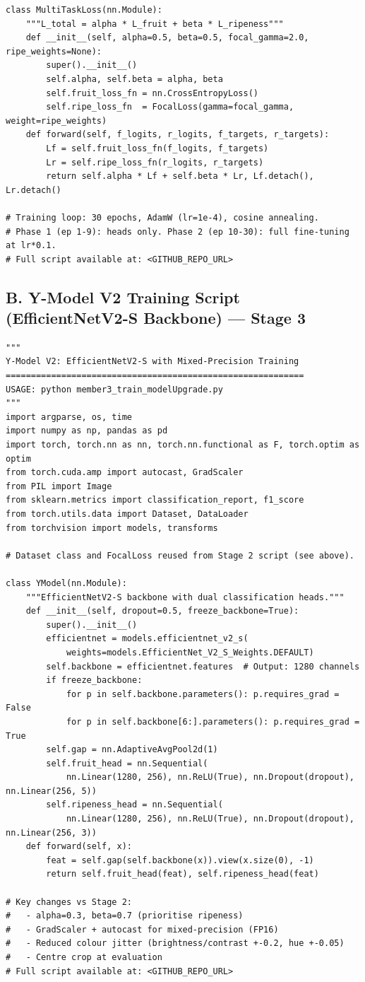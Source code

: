 \documentclass[10pt,twocolumn,letterpaper]{article}
\begin{document}
{\begin{verbatim}
class MultiTaskLoss(nn.Module):
    """L_total = alpha * L_fruit + beta * L_ripeness"""
    def __init__(self, alpha=0.5, beta=0.5, focal_gamma=2.0, ripe_weights=None):
        super().__init__()
        self.alpha, self.beta = alpha, beta
        self.fruit_loss_fn = nn.CrossEntropyLoss()
        self.ripe_loss_fn  = FocalLoss(gamma=focal_gamma, weight=ripe_weights)
    def forward(self, f_logits, r_logits, f_targets, r_targets):
        Lf = self.fruit_loss_fn(f_logits, f_targets)
        Lr = self.ripe_loss_fn(r_logits, r_targets)
        return self.alpha * Lf + self.beta * Lr, Lf.detach(), Lr.detach()

# Training loop: 30 epochs, AdamW (lr=1e-4), cosine annealing.
# Phase 1 (ep 1-9): heads only. Phase 2 (ep 10-30): full fine-tuning at lr*0.1.
# Full script available at: <GITHUB_REPO_URL>
\end{verbatim}
}

\subsection*{B. Y-Model V2 Training Script (EfficientNetV2-S Backbone) — Stage 3}

{\small
\begin{verbatim}
"""
Y-Model V2: EfficientNetV2-S with Mixed-Precision Training
===========================================================
USAGE: python member3_train_modelUpgrade.py
"""
import argparse, os, time
import numpy as np, pandas as pd
import torch, torch.nn as nn, torch.nn.functional as F, torch.optim as optim
from torch.cuda.amp import autocast, GradScaler
from PIL import Image
from sklearn.metrics import classification_report, f1_score
from torch.utils.data import Dataset, DataLoader
from torchvision import models, transforms

# Dataset class and FocalLoss reused from Stage 2 script (see above).

class YModel(nn.Module):
    """EfficientNetV2-S backbone with dual classification heads."""
    def __init__(self, dropout=0.5, freeze_backbone=True):
        super().__init__()
        efficientnet = models.efficientnet_v2_s(
            weights=models.EfficientNet_V2_S_Weights.DEFAULT)
        self.backbone = efficientnet.features  # Output: 1280 channels
        if freeze_backbone:
            for p in self.backbone.parameters(): p.requires_grad = False
            for p in self.backbone[6:].parameters(): p.requires_grad = True
        self.gap = nn.AdaptiveAvgPool2d(1)
        self.fruit_head = nn.Sequential(
            nn.Linear(1280, 256), nn.ReLU(True), nn.Dropout(dropout), nn.Linear(256, 5))
        self.ripeness_head = nn.Sequential(
            nn.Linear(1280, 256), nn.ReLU(True), nn.Dropout(dropout), nn.Linear(256, 3))
    def forward(self, x):
        feat = self.gap(self.backbone(x)).view(x.size(0), -1)
        return self.fruit_head(feat), self.ripeness_head(feat)

# Key changes vs Stage 2:
#   - alpha=0.3, beta=0.7 (prioritise ripeness)
#   - GradScaler + autocast for mixed-precision (FP16)
#   - Reduced colour jitter (brightness/contrast +-0.2, hue +-0.05)
#   - Centre crop at evaluation
# Full script available at: <GITHUB_REPO_URL>
\end{verbatim}
}
\end{document}

